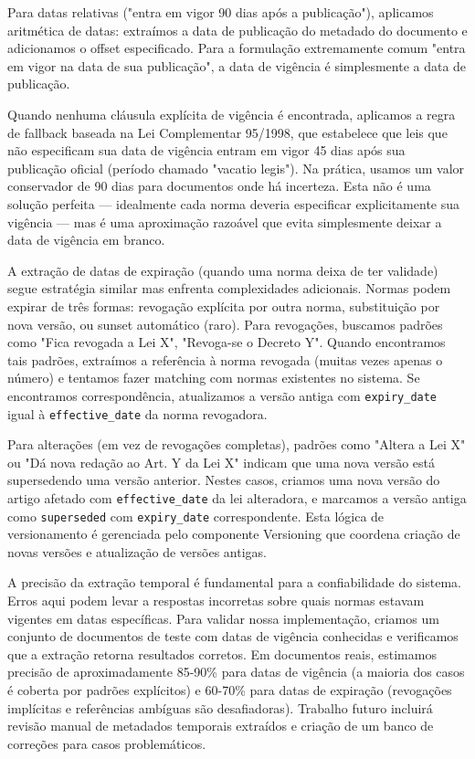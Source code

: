 \documentclass[12pt,a4paper]{article}
\begin{document}
Para datas relativas ("entra em vigor 90 dias após a publicação"), aplicamos aritmética de datas: extraímos a data de publicação do metadado do documento e adicionamos o offset especificado. Para a formulação extremamente comum "entra em vigor na data de sua publicação", a data de vigência é simplesmente a data de publicação.

Quando nenhuma cláusula explícita de vigência é encontrada, aplicamos a regra de fallback baseada na Lei Complementar 95/1998, que estabelece que leis que não especificam sua data de vigência entram em vigor 45 dias após sua publicação oficial (período chamado "vacatio legis"). Na prática, usamos um valor conservador de 90 dias para documentos onde há incerteza. Esta não é uma solução perfeita — idealmente cada norma deveria especificar explicitamente sua vigência — mas é uma aproximação razoável que evita simplesmente deixar a data de vigência em branco.

A extração de datas de expiração (quando uma norma deixa de ter validade) segue estratégia similar mas enfrenta complexidades adicionais. Normas podem expirar de três formas: revogação explícita por outra norma, substituição por nova versão, ou sunset automático (raro). Para revogações, buscamos padrões como "Fica revogada a Lei X", "Revoga-se o Decreto Y". Quando encontramos tais padrões, extraímos a referência à norma revogada (muitas vezes apenas o número) e tentamos fazer matching com normas existentes no sistema. Se encontramos correspondência, atualizamos a versão antiga com \texttt{expiry\_date} igual à \texttt{effective\_date} da norma revogadora.

Para alterações (em vez de revogações completas), padrões como "Altera a Lei X" ou "Dá nova redação ao Art. Y da Lei X" indicam que uma nova versão está supersedendo uma versão anterior. Nestes casos, criamos uma nova versão do artigo afetado com \texttt{effective\_date} da lei alteradora, e marcamos a versão antiga como \texttt{superseded} com \texttt{expiry\_date} correspondente. Esta lógica de versionamento é gerenciada pelo componente Versioning que coordena criação de novas versões e atualização de versões antigas.

A precisão da extração temporal é fundamental para a confiabilidade do sistema. Erros aqui podem levar a respostas incorretas sobre quais normas estavam vigentes em datas específicas. Para validar nossa implementação, criamos um conjunto de documentos de teste com datas de vigência conhecidas e verificamos que a extração retorna resultados corretos. Em documentos reais, estimamos precisão de aproximadamente 85-90\% para datas de vigência (a maioria dos casos é coberta por padrões explícitos) e 60-70\% para datas de expiração (revogações implícitas e referências ambíguas são desafiadoras). Trabalho futuro incluirá revisão manual de metadados temporais extraídos e criação de um banco de correções para casos problemáticos.
\end{document}
